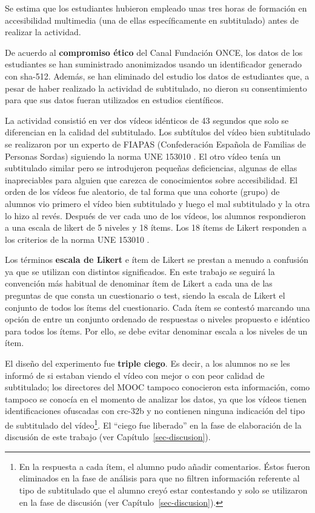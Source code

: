 \documentclass[
  12pt,
  a4paper,
  extrafontsizes,
  onecolumn,
  openright,
  table]{memoir}
\begin{document}
Se estima que los estudiantes hubieron empleado unas tres horas de
formación en accesibilidad multimedia (una de ellas específicamente en
subtitulado) antes de realizar la actividad.

De acuerdo al \textbf{compromiso ético} del Canal Fundación ONCE, los
datos de los estudiantes se han suministrado anonimizados usando un
identificador generado con \gls{sha}-512. Además, se han eliminado del
estudio los datos de estudiantes que, a pesar de haber realizado la
actividad de subtitulado, no dieron su consentimiento para que sus datos
fueran utilizados en estudios científicos.

La actividad consistió en ver dos vídeos idénticos de 43 segundos que
solo se diferencian en la calidad del subtitulado. Los subtítulos del
vídeo bien subtitulado se realizaron por un experto de FIAPAS
(Confederación Española de Familias de Personas Sordas) siguiendo la
norma UNE 153010 \autocite[ver][]{aenor2012}. El otro vídeo tenía un
subtitulado similar pero se introdujeron pequeñas deficiencias, algunas
de ellas inapreciables para alguien que carezca de conocimientos sobre
accesibilidad. El orden de los vídeos fue aleatorio, de tal forma que
una cohorte (grupo) de alumnos vio primero el vídeo bien subtitulado y
luego el mal subtitulado y la otra lo hizo al revés. Después de ver cada
uno de los vídeos, los alumnos respondieron a una \gls{escala de likert}
de 5 niveles y 18 ítems. Los 18 ítems de Likert responden a los
criterios de la norma UNE 153010 \autocite[ver][]{aenor2012}.

Los términos \textbf{escala de Likert} e ítem de Likert se prestan a
menudo a confusión ya que se utilizan con distintos significados. En
este trabajo se seguirá la convención más habitual
\autocite[ver][]{uebersax2006} de denominar ítem de Likert a cada una de
las preguntas de que consta un cuestionario o test, siendo la escala de
Likert el conjunto de todos los ítems del cuestionario. Cada ítem se
contestó marcando una opción de entre un conjunto ordenado de respuestas
o niveles propuesto e idéntico para todos los ítems. Por ello, se debe
evitar denominar escala a los niveles de un ítem.

El diseño del experimento fue \textbf{\gls{triple ciego}}. Es decir, a
los alumnos no se les informó de si estaban viendo el vídeo con mejor o
con peor calidad de subtitulado; los directores del MOOC tampoco
conocieron esta información, como tampoco se conocía en el momento de
analizar los datos, ya que los vídeos tienen identificaciones ofuscadas
con \gls{crc}-32b y no contienen ninguna indicación del tipo de
subtitulado del vídeo\footnote{En la respuesta a cada ítem, el alumno
  pudo añadir comentarios. Éstos fueron eliminados en la fase de
  análisis para que no filtren información referente al tipo de
  subtitulado que el alumno creyó estar contestando y solo se utilizaron
  en la fase de discusión (ver Capítulo~\ref{sec-discusion}).}. El
\enquote{ciego fue liberado} en la fase de elaboración de la discusión
de este trabajo (ver Capítulo~\ref{sec-discusion}).
\end{document}
